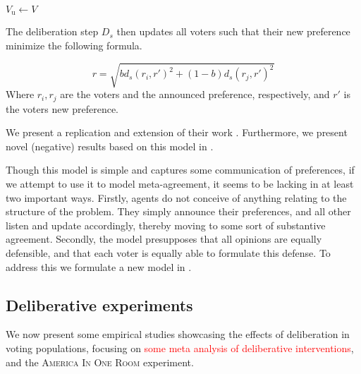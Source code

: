 \IncMargin{1em}
\begin{algorithm}

	\BlankLine

	$V_{\text{u}} \gets V$ \\

\end{algorithm}
\DecMargin{1em}

The deliberation step $D_s$ then updates all voters such that their new
preference  minimize the following formula.

\begin{equation}
	r =
	\sqrt{
		b d_s(r_i, r')^2 + (1-b)d_s(r_j, r')^2
	}
	\label{eq:deliberation_step_formula}
\end{equation}
Where $r_i, r_j$ are the voters and the announced preference, respectively, and
$r'$ is the voters new preference.

We present a replication and extension of their work .
Furthermore, we present novel (negative) results based on this model in
.

Though this model is simple and captures some communication of preferences, if
we attempt to use it to model meta-agreement, it seems to be lacking in at
least two important ways. Firstly, agents do not conceive of anything relating
to the structure of the problem. They simply announce their preferences, and
all other listen and update accordingly, thereby moving to some sort of
substantive agreement. Secondly, the model presupposes that all opinions are
equally defensible, and that each voter is equally able to formulate this
defense. To address this we formulate a new model in .


\subsection{Deliberative experiments}

We now present some empirical studies showcasing the effects of deliberation in
voting populations, focusing on \textcolor{red}{some meta analysis of
deliberative interventions}, and the \textsc{America In One Room} experiment.

